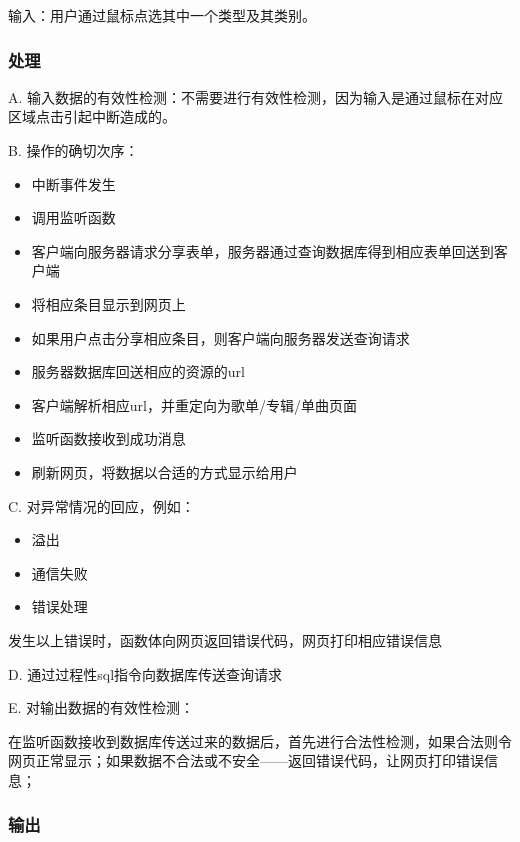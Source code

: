    输入：用户通过鼠标点选其中一个类型及其类别。
   
   
   \subsubsection{处理}
   
   
   
   A. 输入数据的有效性检测：不需要进行有效性检测，因为输入是通过鼠标在对应区域点击引起中断造成的。
   
   B. 操作的确切次序：
   \begin{adjustwidth}{2cm}{1cm}\qquad
	   \begin{itemize}
		   \item 中断事件发生
		   \item 调用监听函数
		   \item 客户端向服务器请求分享表单，服务器通过查询数据库得到相应表单回送到客户端
		   \item 将相应条目显示到网页上
		   \item 如果用户点击分享相应条目，则客户端向服务器发送查询请求
		   \item 服务器数据库回送相应的资源的url
		   \item 客户端解析相应url，并重定向为歌单/专辑/单曲页面
		   \item 监听函数接收到成功消息
		   \item 刷新网页，将数据以合适的方式显示给用户
	   \end{itemize}		
   \end{adjustwidth}
	
   
   C. 对异常情况的回应，例如：
   \begin{adjustwidth}{2cm}{1cm}\qquad
	   \begin{itemize}
		   \item 溢出
		   \item 通信失败
		   \item 错误处理
	   \end{itemize}		
   \end{adjustwidth}
   
	   发生以上错误时，函数体向网页返回错误代码，网页打印相应错误信息
   
D. 通过过程性sql指令向数据库传送查询请求
		   
   E. 对输出数据的有效性检测：
   
   在监听函数接收到数据库传送过来的数据后，首先进行合法性检测，如果合法则令网页正常显示；如果数据不合法或不安全——返回错误代码，让网页打印错误信息；
   
   \subsubsection{输出}
   

